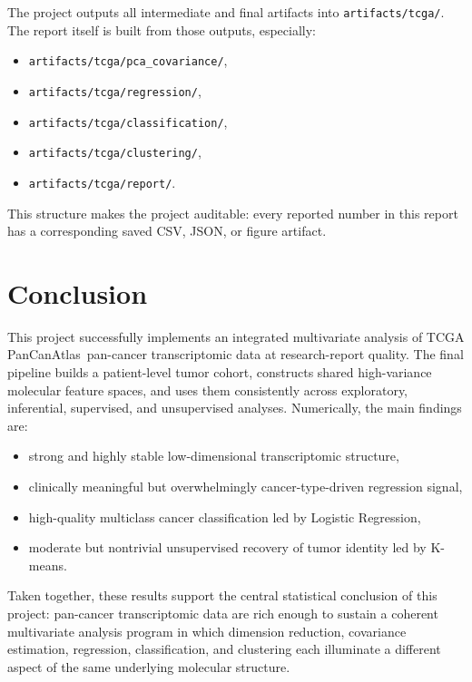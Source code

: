 \documentclass[11pt]{article}
\newcommand{\tcga}{TCGA PanCanAtlas}
\newcommand{\bestclf}{Logistic Regression}
\newcommand{\bestcluster}{K-means}
\begin{document}
The project outputs all intermediate and final artifacts into \texttt{artifacts/tcga/}. The report itself is built from those outputs, especially:
\begin{itemize}
  \item \texttt{artifacts/tcga/pca\_covariance/},
  \item \texttt{artifacts/tcga/regression/},
  \item \texttt{artifacts/tcga/classification/},
  \item \texttt{artifacts/tcga/clustering/},
  \item \texttt{artifacts/tcga/report/}.
\end{itemize}

This structure makes the project auditable: every reported number in this report has a corresponding saved CSV, JSON, or figure artifact.

\section{Conclusion}
This project successfully implements an integrated multivariate analysis of \tcga\ pan-cancer transcriptomic data at research-report quality. The final pipeline builds a patient-level tumor cohort, constructs shared high-variance molecular feature spaces, and uses them consistently across exploratory, inferential, supervised, and unsupervised analyses. Numerically, the main findings are:

\begin{itemize}
  \item strong and highly stable low-dimensional transcriptomic structure,
  \item clinically meaningful but overwhelmingly cancer-type-driven regression signal,
  \item high-quality multiclass cancer classification led by \bestclf,
  \item moderate but nontrivial unsupervised recovery of tumor identity led by \bestcluster.
\end{itemize}

Taken together, these results support the central statistical conclusion of this project: pan-cancer transcriptomic data are rich enough to sustain a coherent multivariate analysis program in which dimension reduction, covariance estimation, regression, classification, and clustering each illuminate a different aspect of the same underlying molecular structure.
\end{document}

